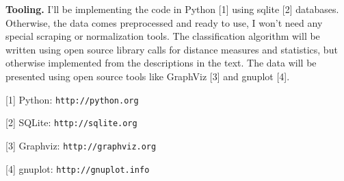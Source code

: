 \documentclass[11pt]{article}
\begin{document}
\textbf{Tooling.} I'll be implementing the code in Python [1] using sqlite [2] databases. 
Otherwise, the data comes preprocessed and ready to use, I won't need any special
scraping or normalization tools. The classification algorithm will be written 
using open source library calls for distance measures and statistics, but otherwise
implemented from the descriptions in the text. The data will be presented using
open source tools like GraphViz [3] and gnuplot [4].

[1] Python: \verb|http://python.org|

[2] SQLite: \verb|http://sqlite.org|

[3] Graphviz: \verb|http://graphviz.org|

[4] gnuplot: \verb|http://gnuplot.info|
\end{document}
